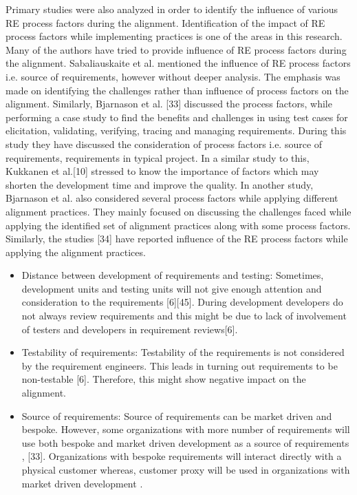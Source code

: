 \documentclass{article}
\begin{document}
Primary studies were also analyzed in order to identify the influence of various RE process factors during the alignment. Identification of the impact of RE process factors while implementing practices is one of the areas in this research. 
Many of the authors have tried to provide influence of RE process factors during the alignment. Sabaliauskaite et al.  mentioned the influence of RE process factors i.e. source of requirements, however without deeper analysis. The emphasis was made on identifying the challenges rather than influence of process factors on the alignment. Similarly, Bjarnason et al. [33] discussed the process factors, while performing a case study to find the benefits and challenges in using test cases for elicitation, validating, verifying, tracing and managing requirements. During this study they have discussed the consideration of process factors i.e. source of requirements, requirements in typical project. In a similar study to this, Kukkanen et al.[10] stressed to know the importance of factors which may shorten the development time and improve the quality. In another study\cite{bjarnason2014challenges}, Bjarnason et al. also considered several process factors while applying different alignment practices. They mainly focused on discussing the challenges faced while applying the identified set of alignment practices along with some process factors. Similarly, the studies [34]\cite{wnuk2014delicate} have reported influence of the RE process factors while applying the alignment practices. 
\begin{itemize}
    \item Distance between development of requirements and testing: Sometimes, development units and testing units will not give enough attention and consideration to the requirements [6][45]. During development developers do not always review requirements and this might be due to lack of involvement of testers and developers in requirement reviews[6].
    \item Testability of requirements: Testability of the requirements is not considered by the requirement engineers. This leads in turning out requirements to be non-testable [6]. Therefore, this might show negative impact on the alignment. 
    \item	Source of requirements: Source of requirements can be market driven and bespoke. However, some organizations with more number of requirements will use both bespoke and market driven development as a source of requirements \cite{kukkanen2009applying}, [33]. Organizations with bespoke requirements will interact directly with a physical customer whereas, customer proxy will be used in organizations with market driven development \cite{bjarnason2014challenges}.  
\end{itemize}
\end{document}
